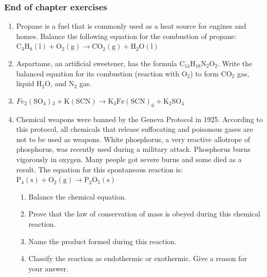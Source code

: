             \subsubsection{ End of chapter exercises      }
            \nopagebreak
      \label{m38727*id67334}\begin{enumerate}[noitemsep, label=\textbf{\arabic*}. ] 
            \label{m38727*uid45}\item Propane is a fuel that is commonly used as a heat source for engines and homes. Balance the following equation for the combustion of propane:
        ${\mathrm{C}}_{3}{\mathrm{H}}_{8}\left(\mathrm{l}\right)+\mathrm{O}{}_{2}\left(\mathrm{g}\right)\to \mathrm{CO}{}_{2}\left(\mathrm{g}\right)+\mathrm{H}{}_{2}\mathrm{O}\left(\mathrm{l}\right)$
        \label{m38727*uid46}\item Aspartame, an artificial sweetener, has the formula ${\mathrm{C}}_{14}{\mathrm{H}}_{18}{\mathrm{N}}_{2}{\mathrm{O}}_{2}$. Write the balanced equation for its combustion (reaction with ${\mathrm{O}}_{2}$) to form ${\mathrm{CO}}_{2}$ gas, liquid $\mathrm{H}{}_{2}\mathrm{O}$, and ${\mathrm{N}}_{2}$ gas.
        \label{m38727*uid47}\item 
${Fe}_{2}\left({\mathrm{SO}}_{4}\right){}_{3}+\mathrm{K\left(SCN\right)}\to {\mathrm{K}}_{3}{\mathrm{Fe\left(SCN\right)}}_{6}+{\mathrm{K}}_{2}{\mathrm{SO}}_{4}$
                \label{m38727*uid48}\item Chemical weapons were banned by the Geneva Protocol in 1925. According to this protocol, all chemicals that release suffocating and poisonous gases are not to be used as weapons. White phosphorus, a very reactive allotrope of phosphorus, was recently used during a military attack. Phosphorus burns vigorously in oxygen. Many people got severe burns and some died as a result. The equation for this spontaneous reaction is:
        ${\mathrm{P}}_{4}\left(\mathrm{s}\right)+{\mathrm{O}}_{2}\left(\mathrm{g}\right)\to {\mathrm{P}}_{2}{\mathrm{O}}_{5}\left(\mathrm{s}\right)$\label{m38727*id67821}\begin{enumerate}[noitemsep, label=\textbf{\alph*}. ] 
            \label{m38727*uid49}\item Balance the chemical equation.
\label{m38727*uid50}\item Prove that the law of conservation of mass is obeyed during this chemical reaction.
\label{m38727*uid51}\item Name the product formed during this reaction.
\label{m38727*uid52}\item Classify the reaction as endothermic or exothermic. Give a reason for your answer.

\end{enumerate}
\end{enumerate}
